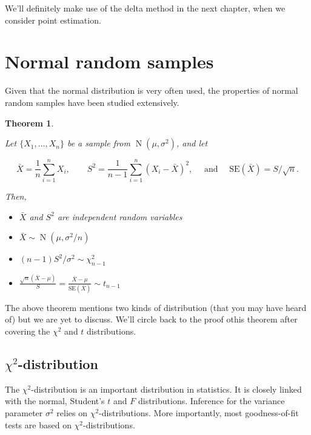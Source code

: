\documentclass[
]{book}
\providecommand{\tightlist}{%
  \setlength{\itemsep}{0pt}\setlength{\parskip}{0pt}}
\DeclareMathOperator{\N}{N}
\newtheorem{theorem}{Theorem}[chapter]
\theoremstyle{definition}
\theoremstyle{definition}
\theoremstyle{definition}
\theoremstyle{definition}
\theoremstyle{remark}
\begin{document}
We'll definitely make use of the delta method in the next chapter, when we consider point estimation.

\hypertarget{normal-random-samples}{%
\section{Normal random samples}\label{normal-random-samples}}

Given that the normal distribution is very often used, the properties of normal random samples have been studied extensively.

\begin{theorem}
\protect\hypertarget{thm:propertynormalsamp}{}\label{thm:propertynormalsamp}

Let \(\{X_1,\dots,X_n \}\) be a sample from \(\N(\mu,\sigma^2)\), and let

\[\bar X = \frac{1}{n}\sum_{i=1}^n X_i, \hspace{2em} 
    S^2 =  \frac{1}{n-1}\sum_{i=1}^n (X_i - \bar X)^2, \hspace{1em} 
    \text{ and } \hspace{1em} \text{SE}(\bar X) = S/\sqrt{n}.\]

Then,

\begin{itemize}
\tightlist
\item
  \(\bar X\) and \(S^2\) are independent random variables
\item
  \(\bar X \sim \N(\mu,\sigma^2/n)\)
\item
  \((n-1)S^2/\sigma^2 \sim \chi^2_{n-1}\)
\item
  \(\frac{\sqrt n (\bar X - \mu)}{S} = \frac{\bar X - \mu}{\text{SE}(\bar X)} \sim t_{n-1}\)
\end{itemize}

\end{theorem}

The above theorem mentions two kinds of distribution (that you may have heard of) but we are yet to discuss.
We'll circle back to the proof othis theorem after covering the \(\chi^2\) and \(t\) distributions.

\hypertarget{chi2-distribution}{%
\subsection{\texorpdfstring{\(\chi^2\)-distribution}{\textbackslash chi\^{}2-distribution}}\label{chi2-distribution}}

The \(\chi^2\)-distribution is an important distribution in statistics.
It is closely linked with the normal, Student's \(t\) and \(F\) distributions. Inference for the variance parameter \(\sigma^2\) relies on \(\chi^2\)-distributions.
More importantly, most goodness-of-fit tests are based on \(\chi^2\)-distributions.
\end{document}
